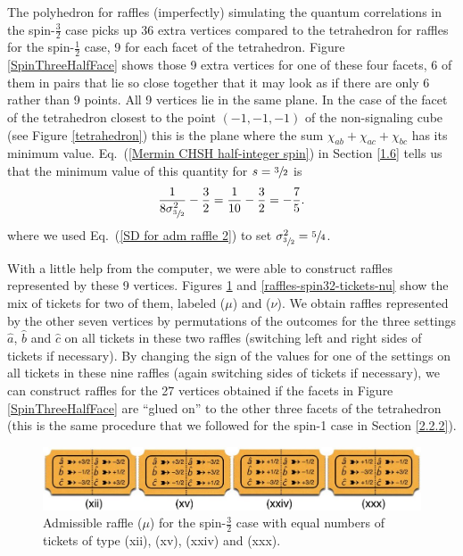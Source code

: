 The polyhedron for raffles (imperfectly) simulating the quantum correlations in the spin-$\frac32$ case picks up 36 extra vertices compared to the tetrahedron for raffles for the spin-$\frac12$ case, 9 for each facet of the tetrahedron. Figure \ref{SpinThreeHalfFace} shows those 9 extra vertices for one of these four facets, 6 of them in pairs that lie so close together that it may look as if there are only 6 rather than 9 points. All 9 vertices lie in the same plane. In the case of the facet of the tetrahedron closest to the point $(-1, -1, -1)$ of the non-signaling cube (see Figure \ref{tetrahedron}) this is the plane where the sum $\chi_{ab} + \chi_{ac} + \chi_{bc}$ has its minimum value. Eq.\ (\ref{Mermin CHSH half-integer spin}) in Section \ref{1.6} tells us that the minimum value of this quantity for $s = \sfrac32$ is
\begin{equation}
 \frac{1}{8\sigma_{\sfrac32}^2} - \frac32 = \frac{1}{10} - \frac32 = -\frac75.
\end{equation}
where we used Eq.\ (\ref{SD for adm raffle 2}) to set $\sigma_{\sfrac32}^2 = \sfrac54$.

With a little help from the computer, we were able to construct raffles represented by these 9 vertices. Figures \ref{raffles-spin32-tickets-mu} and \ref{raffles-spin32-tickets-nu} show the mix of tickets for two of them, labeled ($\mu$) and ($\nu$). We obtain raffles represented by the other seven vertices by permutations of the outcomes for the three settings $\hat{a}$, $\hat{b}$ and $\hat{c}$ on all tickets in these two raffles (switching left and right sides of tickets if necessary). By changing the sign of the values for one of the settings on all tickets in these nine raffles (again switching sides of tickets if necessary), we can construct raffles for the 27 vertices obtained if the facets in Figure \ref{SpinThreeHalfFace} are ``glued on'' to the other three facets of the tetrahedron (this is the same procedure that we followed for the spin-1 case in Section \ref{2.2.2}).

\begin{figure}[h]
 \centering
   \includegraphics[width=6in]{raffles-spin32-tickets-mu.jpeg} 
   \caption{Admissible raffle ($\mu$) for the spin-$\frac32$ case with equal numbers of tickets of type (xii), (xv), (xxiv) and (xxx).}
    \label{raffles-spin32-tickets-mu}
\end{figure}

